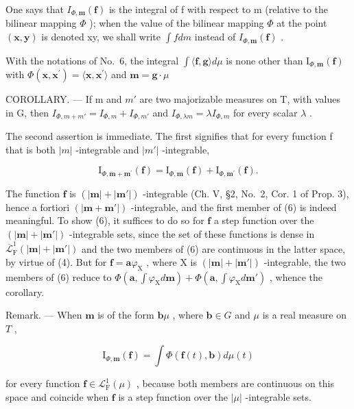 One says that \(I_{\Phi,\mathbf{m}}(\mathbf{f})\) is the integral of f with respect to m (relative to the bilinear mapping \(\Phi\) ); when the value of the bilinear mapping \(\Phi\) at the point \((\mathbf{x},\mathbf{y})\) is denoted xy, we shall write \(\int f dm\) instead of \(I_{\Phi,\mathbf{m}}(\mathbf{f})\) .

With the notations of No.~6, the integral \(\int \langle \mathbf{f},\mathbf{g}\rangle d\mu\) is none other than \(\mathrm{I}_{\Phi ,\mathbf{m}}(\mathbf{f})\) with \(\Phi (\mathbf{x},\mathbf{x}^{\prime}) = \langle \mathbf{x},\mathbf{x}^{\prime}\rangle\) and \(\mathbf{m} = \mathbf{g}\cdot \mu\)

COROLLARY. --- If m and \(m'\) are two majorizable measures on T, with values in G, then \(I_{\Phi,m+m'} = I_{\Phi,m} + I_{\Phi,m'}\) and \(I_{\Phi,\lambda m} = \lambda I_{\Phi,m}\) for every scalar \(\lambda\) .

The second assertion is immediate. The first signifies that for every function f that is both \(|m|\) -integrable and \(|m'|\) -integrable,

\[
\mathrm{I} _ {\Phi , \mathbf {m} + \mathbf {m} ^ {\prime}} (\mathbf {f}) = \mathrm{I} _ {\Phi , \mathbf {m}} (\mathbf {f}) + \mathrm{I} _ {\Phi , \mathbf {m} ^ {\prime}} (\mathbf {f}).\tag{6}
\]

The function \(\mathbf{f}\) is \((|\mathbf{m}| + |\mathbf{m}'|)\) -integrable (Ch. V, §2, No.~2, Cor. 1 of Prop. 3), hence a fortiori \((|\mathbf{m} + \mathbf{m}'|)\) -integrable, and the first member of (6) is indeed meaningful. To show (6), it suffices to do so for \(\mathbf{f}\) a step function over the \((|\mathbf{m}| + |\mathbf{m}'|)\) -integrable sets, since the set of these functions is dense in \(\overline{\mathcal{L}}_{\mathrm{F}}^{1}(|\mathbf{m}| + |\mathbf{m}'|)\) and the two members of (6) are continuous in the latter space, by virtue of (4). But for \(\mathbf{f} = \mathbf{a}\varphi_{\mathrm{X}}\) , where \(\mathrm{X}\) is \((|\mathbf{m}| + |\mathbf{m}'|)\) -integrable, the two members of (6) reduce to \(\Phi(\mathbf{a}, \int \varphi_{\mathrm{X}} d\mathbf{m}) + \Phi(\mathbf{a}, \int \varphi_{\mathrm{X}} d\mathbf{m}')\) , whence the corollary.

Remark. --- When \(\mathbf{m}\) is of the form \(\mathbf{b}\mu\) , where \(\mathbf{b} \in G\) and \(\mu\) is a real measure on \(T\) ,

\[
\mathrm{I} _ {\Phi , \mathbf {m}} (\mathbf {f}) = \int \Phi (\mathbf {f} (t), \mathbf {b}) d \mu (t)
\]

for every function \(\mathbf{f} \in \mathcal{L}_{\mathrm{F}}^{1}(\mu)\) , because both members are continuous on this space and coincide when \(\mathbf{f}\) is a step function over the \(|\mu|\) -integrable sets.

